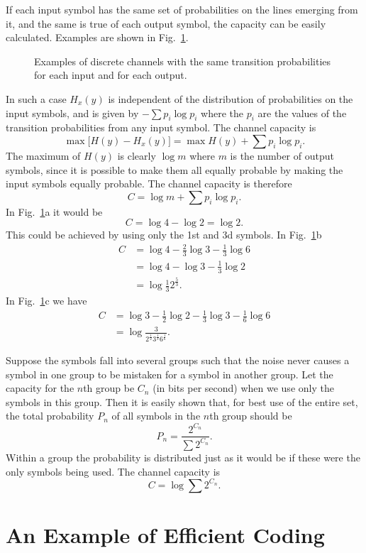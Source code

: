 If each input symbol has the same set of probabilities on the lines
emerging from it, and the same is true of each output symbol, the capacity
can be easily calculated.  Examples are shown in Fig.~\ref{fig:12}.
\begin{figure}[ht]
\centerline{}
\caption{Examples of discrete channels with the same transition
probabilities for each input and for each output.}
\label{fig:12}
\end{figure}
In such a case $H_x(y)$ is independent of the distribution of
probabilities on the input symbols, and is given by $-\sum p_i\log p_i$
where the $p_i$ are the values of the transition probabilities from any
input symbol.  The channel capacity is
$$
\max \bigl[ H(y) - H_x(y) \bigr] = \max H(y) + \sum p_i \log p_i.
$$
The maximum of $H(y)$ is clearly $\log m$ where $m$ is the number of
output symbols, since it is possible to make them all equally probable
by making the input symbols equally probable.  The channel capacity
is therefore
$$
C = \log m + \sum p_i \log p_i.
$$
In Fig.~\ref{fig:12}a it would be
$$
C = \log 4 - \log 2 = \log 2.
$$
This could be achieved by using only the 1st and 3d symbols.  In
Fig.~\ref{fig:12}b
\begin{align*}
C &= \log 4 - \tfrac23 \log 3 - \tfrac13 \log 6 \\
&= \log 4 - \log 3 - \tfrac13 \log 2 \\
&= \log \tfrac13 2^{\frac53}.
\end{align*}
In Fig.~\ref{fig:12}c we have
\begin{align*}
C &= \log 3 - \tfrac12 \log 2 - \tfrac13 \log 3 - \tfrac16 \log 6 \\
&= \log \frac{3}{2^{\frac12} 3^{\frac13} 6^{\frac16}}.
\end{align*}

Suppose the symbols fall into several groups such that the noise never
causes a symbol in one group to be mistaken for a symbol in another group.
Let the capacity for the $n$th group be $C_n$ (in bits per second) when
we use only the symbols in this group.  Then it is easily shown that,
for best use of the entire set, the total probability $P_n$ of all
symbols in the $n$th group should be
$$
P_n = \frac{2^{C_n}}{\sum 2^{C_n}}.
$$
Within a group the probability is distributed just as it would be if
these were the only symbols being used.  The channel capacity is
$$
C = \log \sum 2^{C_n}.
$$

\section{An Example of Efficient Coding}

